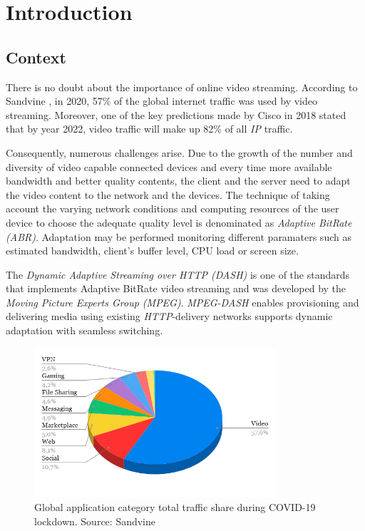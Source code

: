 \chapter{Introduction}
\label{chap:introduction}

\section{Context}
\label{sec:context}

There is no doubt about the importance of online video streaming.
According to Sandvine \cite{sandvine1},
in 2020, 57\% of the global internet traffic was used by video streaming.
Moreover, one of the key predictions made by Cisco in 2018 \cite{cisco1}
stated that by year 2022, video traffic will make up 82\% 
of all \textit{IP} traffic.

Consequently, numerous challenges arise. Due to the
growth of the number and diversity of video capable connected 
devices and every time more available bandwidth and better quality 
contents, the client and the server need to adapt the video content to
the network and the devices. The technique of taking account the 
varying network conditions and computing resources of the user 
device to choose the adequate quality level is denominated as
\textit{Adaptive BitRate (ABR)}. Adaptation may be performed
monitoring different paramaters such as estimated bandwidth,
client's buffer level, CPU load or screen size.

The \textit{Dynamic Adaptive Streaming over HTTP (DASH)} is one of the
standards that implements Adaptive BitRate video streaming and was developed
by the \textit{Moving Picture Experts Group (MPEG)}\cite{dash1}. \textit{MPEG-DASH} 
enables provisioning and delivering media using existing \textit{HTTP}-delivery 
networks supports dynamic adaptation with seamless switching.


\begin{figure}[h]
  \centering
  \label{fig:chart1}
  \includegraphics[width=0.8\textwidth]{img/chart1.png}
  \caption{Global application category total traffic share during COVID-19 lockdown. Source: Sandvine\cite{sandvine1}}
\end{figure}

